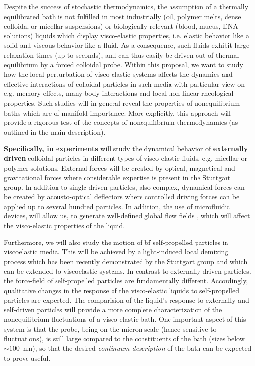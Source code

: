 \begin{workpackage}
\begin{wpdescription}
Despite the success of stochastic thermodynamics, the assumption of a thermally equilibrated bath is not fulfilled in most industrially (oil, polymer melts, dense colloidal or micellar suspensions) or biologically relevant (blood, mucus, DNA-solutions) liquids which display visco-elastic properties, i.e. elastic behavior like a solid and viscous
behavior like a fluid. As a consequence, such
fluids exhibit large relaxation times (up to seconds), and can thus easily be driven
out of thermal equilibrium by a forced colloidal probe. Within this proposal, we want to study how the local perturbation of visco-elastic systems affects the dynamics and effective interactions of colloidal particles in such media with particular view on e.g. memory effects, many body interactions and local non-linear rheological properties. Such studies will in general reveal the
properties of nonequilibrium baths which are of manifold importance. More explicitly, this approach will provide a rigorous test of the concepts of nonequilibrium thermodynamics (as outlined in the main
description).


{\bf Specifically, in experiments} will study the dynamical behavior of {\bf externally driven} colloidal particles in different types of visco-elastic
fluids, e.g. micellar or polymer solutions. External forces will be created by optical, magnetical and gravitational forces where considerable expertise is present in the Stuttgart group. In addition to single driven particles, also complex, dynamical forces can be created by acousto-optical deflectors where controlled driving forces can be applied up to several hundred particles. In addition, the use of microfluidic devices, will allow us, to generate well-defined global flow fields \cite{scholz2012}, which will affect the visco-elastic properties of the liquid.

Furthermore, we will also study the motion of {bf self-propelled particles} in viscoelastic media. This will be achieved by a light-induced local demixing process which has been recently demonstrated by the Stuttgart group \cite{kuemmel2013, buttinoni2013, tenHagen2014} and which can be extended to viscoelastic systems. In contrast to externally driven particles, the force-field of self-propelled particles are fundamentally different. Accordingly, qualitative changes in the response of the visco-elastic liquids to self-propelled particles are expected. The comparision of the liquid's response to externally and self-driven particles will provide a more complete characterization of the
nonequilibrium fluctuations of a visco-elastic bath. One important aspect of this system is that the
probe, being on the micron scale (hence sensitive to fluctuations), is still large compared
to the constituents of the bath (sizes below $\sim 100$~nm), so that the desired {\it
  continuum description} of the bath can be expected to prove useful.


\end{wpdescription}
\end{workpackage}
